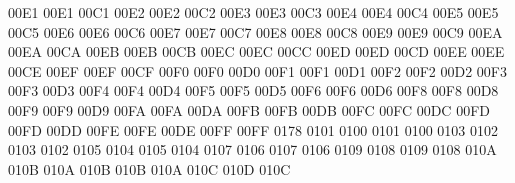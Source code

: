 \setcclcuc 00E1 00E1 00C1 %
\setcclcuc 00E2 00E2 00C2 %
\setcclcuc 00E3 00E3 00C3 %
\setcclcuc 00E4 00E4 00C4 %
\setcclcuc 00E5 00E5 00C5 %
\setcclcuc 00E6 00E6 00C6 %
\setcclcuc 00E7 00E7 00C7 %
\setcclcuc 00E8 00E8 00C8 %
\setcclcuc 00E9 00E9 00C9 %
\setcclcuc 00EA 00EA 00CA %
\setcclcuc 00EB 00EB 00CB %
\setcclcuc 00EC 00EC 00CC %
\setcclcuc 00ED 00ED 00CD %
\setcclcuc 00EE 00EE 00CE %
\setcclcuc 00EF 00EF 00CF %
\setcclcuc 00F0 00F0 00D0 %
\setcclcuc 00F1 00F1 00D1 %
\setcclcuc 00F2 00F2 00D2 %
\setcclcuc 00F3 00F3 00D3 %
\setcclcuc 00F4 00F4 00D4 %
\setcclcuc 00F5 00F5 00D5 %
\setcclcuc 00F6 00F6 00D6 %
\setcclcuc 00F8 00F8 00D8 %
\setcclcuc 00F9 00F9 00D9 %
\setcclcuc 00FA 00FA 00DA %
\setcclcuc 00FB 00FB 00DB %
\setcclcuc 00FC 00FC 00DC %
\setcclcuc 00FD 00FD 00DD %
\setcclcuc 00FE 00FE 00DE %
\setcclcuc 00FF 00FF 0178 %
 0101 0100 %
 0101 0100 %
 0103 0102 %
 0103 0102 %
 0105 0104 %
 0105 0104 %
 0107 0106 %
 0107 0106 %
 0109 0108 %
 0109 0108 %
\setcclcuc 010A 010B 010A %
\setcclcuc 010B 010B 010A %
\setcclcuc 010C 010D 010C %
